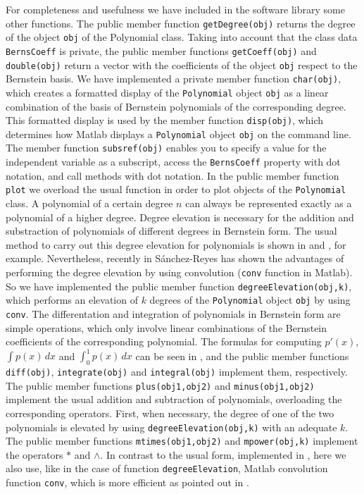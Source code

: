 \documentclass[a4paper,10pt]{report}
\begin{document}
For completeness and usefulness we have included in the software library some other functions. The public member function \verb"getDegree(obj)"
returns the degree of the object \verb"obj" of the Polynomial class. Taking into account that the class data \verb"BernsCoeff" is private, the public 
member functions \verb"getCoeff(obj)" and \verb"double(obj)" return a vector with the coefficients of the object \verb"obj" respect to the Bernstein basis.
We have implemented a private member function \verb"char(obj)", which creates a formatted display of the \verb"Polynomial" object \verb"obj" as
a linear combination of the basis of Bernstein polynomials of the corresponding degree. This formatted display is used by the member 
function \verb"disp(obj)", which determines how Matlab displays a \verb"Polynomial" object \verb"obj" on the command line. 
The member function \verb"subsref(obj)" enables you to specify a value for the independent variable as a subscript, 
access the \verb"BernsCoeff" property with dot notation, and call methods with dot notation. In the public member function
\verb"plot" we overload the usual function in order to plot objects of the \verb"Polynomial" class. A polynomial of a certain
degree $n$ can always be represented exactly as a polynomial of a higher degree. Degree elevation is necessary for the addition 
and substraction of polynomials of different degrees in Bernstein form. The usual method to carry out this degree elevation
for polynomials is shown in \cite{farin} and \cite{BPOLY}, for example. Nevertheless, recently in \cite{S-R} S\'anchez-Reyes has shown the advantages
of performing the degree elevation by using convolution (\verb"conv" function in Matlab). So we have implemented the public member function
\verb"degreeElevation(obj,k)", which performs an elevation of $k$ degrees of the \verb"Polynomial" object \verb"obj" by using \verb"conv".
The differentation and integration of polynomials in Bernstein form are simple operations, which
only involve linear combinations of the Bernstein coefficients of the corresponding polynomial. The formulas for computing
$p'(x)$, $\int p(x)\,dx$ and $\int_0^1 p(x)\,dx$ can be seen in \cite{F-R88}, and the public member functions \verb"diff(obj)",
\verb"integrate(obj)" and \verb"integral(obj)" implement them, respectively. The public member functions \verb"plus(obj1,obj2)" and \verb"minus(obj1,obj2)"
implement the usual addition and subtraction of polynomials, overloading the corresponding operators. First, when necessary, the degree of one of the two polynomials is elevated
by using \verb"degreeElevation(obj,k)" with an adequate $k$. The public member functions \verb"mtimes(obj1,obj2)" and \verb"mpower(obj,k)" implement
the operators $*$ and $\wedge$. In contrast to the usual form, implemented in \cite{BPOLY}, here we also use, like in the case of function \verb"degreeElevation",
Matlab convolution function \verb"conv", which is more efficient as pointed out in \cite{S-R}. 
\end{document}
